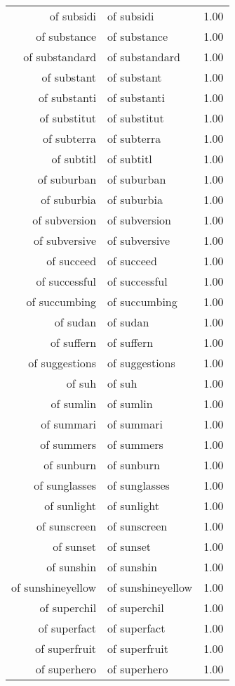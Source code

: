 \begin{table}[ht]
\begin{tabular}{rlr}
  of subsidi & of subsidi & 1.00 \\ 
  of substance & of substance & 1.00 \\ 
  of substandard & of substandard & 1.00 \\ 
  of substant & of substant & 1.00 \\ 
  of substanti & of substanti & 1.00 \\ 
  of substitut & of substitut & 1.00 \\ 
  of subterra & of subterra & 1.00 \\ 
  of subtitl & of subtitl & 1.00 \\ 
  of suburban & of suburban & 1.00 \\ 
  of suburbia & of suburbia & 1.00 \\ 
  of subversion & of subversion & 1.00 \\ 
  of subversive & of subversive & 1.00 \\ 
  of succeed & of succeed & 1.00 \\ 
  of successful & of successful & 1.00 \\ 
  of succumbing & of succumbing & 1.00 \\ 
  of sudan & of sudan & 1.00 \\ 
  of suffern & of suffern & 1.00 \\ 
  of suggestions & of suggestions & 1.00 \\ 
  of suh & of suh & 1.00 \\ 
  of sumlin & of sumlin & 1.00 \\ 
  of summari & of summari & 1.00 \\ 
  of summers & of summers & 1.00 \\ 
  of sunburn & of sunburn & 1.00 \\ 
  of sunglasses & of sunglasses & 1.00 \\ 
  of sunlight & of sunlight & 1.00 \\ 
  of sunscreen & of sunscreen & 1.00 \\ 
  of sunset & of sunset & 1.00 \\ 
  of sunshin & of sunshin & 1.00 \\ 
  of sunshineyellow & of sunshineyellow & 1.00 \\ 
  of superchil & of superchil & 1.00 \\ 
  of superfact & of superfact & 1.00 \\ 
  of superfruit & of superfruit & 1.00 \\ 
  of superhero & of superhero & 1.00 \\ 

\end{tabular}
\end{table}
